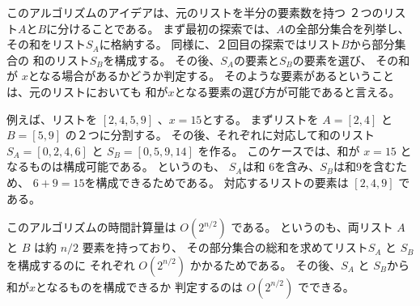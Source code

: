 \begin{comment}
The idea is to divide the list into
two lists $A$ and $B$ such that both
lists contain about half of the numbers.
The first search generates all subsets
of $A$ and stores their sums to a list $S_A$.
Correspondingly, the second search creates
a list $S_B$ from $B$.
After this, it suffices to check if it is possible
to choose one element from $S_A$ and another
element from $S_B$ such that their sum is $x$.
This is possible exactly when there is a way to
form the sum $x$ using the numbers of the original list.

For example, suppose that the list is $[2,4,5,9]$ and $x=15$.
First, we divide the list into $A=[2,4]$ and $B=[5,9]$.
After this, we create lists
$S_A=[0,2,4,6]$ and $S_B=[0,5,9,14]$.
In this case, the sum $x=15$ is possible to form,
because $S_A$ contains the sum $6$,
$S_B$ contains the sum $9$, and $6+9=15$.
This corresponds to the solution $[2,4,9]$.

We can implement the algorithm so that
its time complexity is $O(2^{n/2})$.
First, we generate \emph{sorted} lists $S_A$ and $S_B$,
which can be done in $O(2^{n/2})$ time using a merge-like technique.
After this, since the lists are sorted,
we can check in $O(2^{n/2})$ time if
the sum $x$ can be created from $S_A$ and $S_B$.
\end{comment}

このアルゴリズムのアイデアは、元のリストを半分の要素数を持つ
２つのリスト$A$と$B$に分けることである。
まず最初の探索では、$A$の全部分集合を列挙し、
その和をリスト$S_A$に格納する。
同様に、２回目の探索ではリスト$B$から部分集合の
和のリスト$S_B$を構成する。
その後、$S_A$の要素と$S_B$の要素を選び、
その和が $x$となる場合があるかどうか判定する。
そのような要素があるということは、元のリストにおいても
和が$x$となる要素の選び方が可能であると言える。

例えば、リストを $[2,4,5,9]$ 、$x=15$とする。
まずリストを $A=[2,4]$ と $B=[5,9]$ の２つに分割する。
その後、それぞれに対応して和のリスト$S_A=[0,2,4,6]$ と $S_B=[0,5,9,14]$ を作る。
このケースでは、和が $x=15$ となるものは構成可能である。
というのも、 $S_A$は和 $6$を含み、$S_B$は和$9$を含むため、
$6+9=15$を構成できるためである。
対応するリストの要素は $[2,4,9]$ である。

このアルゴリズムの時間計算量は $O(2^{n/2})$ である。
というのも、両リスト $A$ と $B$ は約 $n/2$ 要素を持っており、
その部分集合の総和を求めてリスト$S_A$ と $S_B$を構成するのに
それぞれ $O(2^{n/2})$ かかるためである。
その後、$S_A$ と $S_B$から和が$x$となるものを構成できるか
判定するのは $O(2^{n/2})$ でできる。
